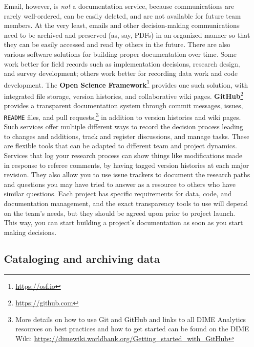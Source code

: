 \documentclass[
]{book}
\begin{document}
Email, however, is \emph{not} a documentation service, because communications are rarely well-ordered,
can be easily deleted, and are not available for future team members.
At the very least, emails and other decision-making communications
need to be archived and preserved (as, say, PDFs)
in an organized manner so that they can be easily accessed and read by others in the future.
There are also various software solutions for building proper documentation over time.
Some work better for field records such as implementation decisions,
research design, and survey development;
others work better for recording data work and code development.
The \textbf{Open Science Framework}\footnote{\url{https://osf.io}} provides one such solution,
with integrated file storage, version histories, and collaborative wiki pages.
\textbf{GitHub}\footnote{\url{https://github.com}} provides a transparent documentation system
through commit messages, issues, \texttt{README} files, and pull requests,\footnote{More details on how to use Git and GitHub and links to all DIME Analytics
  resources on best practices and how to get started can be found on the DIME Wiki:
  \url{https://dimewiki.worldbank.org/Getting_started_with_GitHub}}
in addition to version histories and wiki pages.
Such services offer multiple different ways
to record the decision process leading to changes and additions,
track and register discussions, and manage tasks.
These are flexible tools that can be adapted to different team and project dynamics.
Services that log your research process can show things like modifications made in response to referee comments,
by having tagged version histories at each major revision.
They also allow you to use issue trackers
to document the research paths and questions you may have tried to answer
as a resource to others who have similar questions.
Each project has specific requirements for data, code, and documentation management,
and the exact transparency tools to use will depend on the team's needs,
but they should be agreed upon prior to project launch.
This way, you can start building a project's documentation as soon as you start making decisions.

\hypertarget{cataloging-and-archiving-data}{%
\subsection*{Cataloging and archiving data}\label{cataloging-and-archiving-data}}
\end{document}
